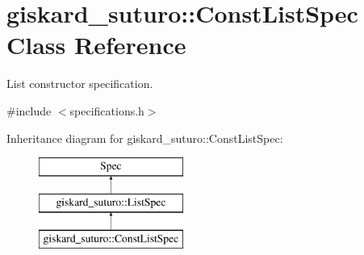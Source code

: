 \hypertarget{classgiskard__suturo_1_1ConstListSpec}{\section{giskard\-\_\-suturo\-:\-:Const\-List\-Spec Class Reference}
\label{classgiskard__suturo_1_1ConstListSpec}
}


List constructor specification.  




{\ttfamily \#include $<$specifications.\-h$>$}

Inheritance diagram for giskard\-\_\-suturo\-:\-:Const\-List\-Spec\-:\begin{figure}[H]
\begin{center}
\leavevmode
\includegraphics[height=3.000000cm]{classgiskard__suturo_1_1ConstListSpec}
\end{center}
\end{figure}

